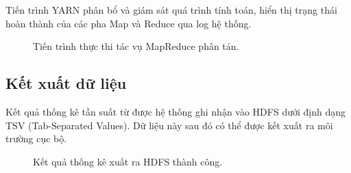 Tiến trình YARN phân bổ và giám sát quá trình tính toán, hiển thị trạng thái hoàn thành của các pha Map và Reduce qua log hệ thống.

\begin{figure}[H]
    \centering
    \caption{Tiến trình thực thi tác vụ MapReduce phân tán.}
    \label{fig:mapreduce_run}
\end{figure}

\subsection{Kết xuất dữ liệu}
Kết quả thống kê tần suất từ được hệ thống ghi nhận vào HDFS dưới định dạng TSV (Tab-Separated Values). Dữ liệu này sau đó có thể được kết xuất ra môi trường cục bộ.

\begin{figure}[H]
    \centering
    \caption{Kết quả thống kê xuất ra HDFS thành công.}
    \label{fig:wordcount_result}
\end{figure}


